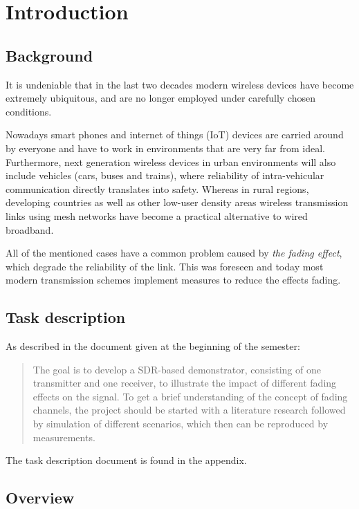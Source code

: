 
\chapter{Introduction}

\section{Background}

It is undeniable that in the last two decades modern wireless devices have become extremely ubiquitous, and are no longer employed under carefully chosen conditions.

Nowadays smart phones and internet of things (IoT) devices are carried around by everyone and have to work in environments that are very far from ideal. Furthermore, next generation wireless devices in urban environments will also include vehicles (cars, buses and trains)\cite{AntonescuTB17}, where reliability of intra-vehicular communication directly translates into safety. Whereas in rural regions, developing countries as well as other low-user density areas wireless transmission links using mesh networks have become a practical alternative to wired broadband\cite{Macmillan2019tidal,Subramanian2006rethinking,Flickenger2007wireless}.

All of the mentioned cases have a common problem caused by \emph{the fading effect}, which degrade the reliability of the link\cite{Mathis}. This was foreseen\cite{Frederiksen2002overview,Maddocks1993introduction} and today most modern transmission schemes implement measures to reduce the effects fading\cite{Mathis,Hsu}.

\section{Task description}

As described in the document given at the beginning of the semester:
\begin{quote}
	The goal is to develop a SDR-based demonstrator, consisting of one transmitter and one receiver, to illustrate the impact of different fading effects on the signal. To get a brief understanding of the concept of fading channels, the project should be started with a literature research followed by simulation of different scenarios, which then can be reproduced by measurements.
\end{quote}
The task description document is found in the appendix.

\section{Overview}
